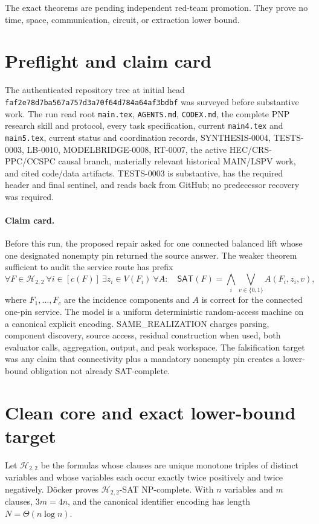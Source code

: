 \documentclass[11pt]{article}
\newcommand{\SAT}{\mathsf{SAT}}
\newcommand{\Htwo}{\mathcal H_{2,2}}
\begin{document}
The exact theorems are pending independent red-team promotion.  They prove
no time, space, communication, circuit, or extraction lower bound.

\section{Preflight and claim card}

The authenticated repository tree at initial head
\texttt{faf2e78d7ba567a757d3a70f64d784a64af3bdbf} was surveyed before
substantive work.  The run read root \texttt{main.tex}, \texttt{AGENTS.md},
\texttt{CODEX.md}, the complete PNP research skill and protocol, every task
specification, current \texttt{main4.tex} and \texttt{main5.tex}, current
status and coordination records, SYNTHESIS-0004, TESTS-0003, LB-0010,
MODELBRIDGE-0008, RT-0007, the active HEC/CRS-PPC/CCSPC causal branch,
materially relevant historical MAIN/LSPV work, and cited code/data artifacts.
TESTS-0003 is substantive, has the required header and final sentinel, and
reads back from GitHub; no predecessor recovery was required.

\paragraph{Claim card.}
Before this run, the proposed repair asked for one connected balanced lift
whose one designated nonempty pin returned the source answer.  The weaker
theorem sufficient to audit the service route has prefix
\[
 \forall F\in\Htwo\ \forall i\in[c(F)]\ \exists z_i\in V(F_i)\
 \forall A:\quad
 \SAT(F)=\bigwedge_i\bigvee_{v\in\{0,1\}}
 A(F_i,z_i,v),                                             \tag{1}
\]
where $F_1,\ldots,F_c$ are the incidence components and $A$ is correct for
the connected one-pin service.  The model is a uniform deterministic
random-access machine on a canonical explicit encoding.  SAME\_REALIZATION
charges parsing, component discovery, source access, residual construction
when used, both evaluator calls, aggregation, output, and peak workspace.
The falsification target was any claim that connectivity plus a mandatory
nonempty pin creates a lower-bound obligation not already SAT-complete.

\section{Clean core and exact lower-bound target}

Let $\Htwo$ be the formulas whose clauses are unique monotone triples of
distinct variables and whose variables each occur exactly twice positively
and twice negatively.  D\"ocker proves $\Htwo$-SAT NP-complete.  With $n$
variables and $m$ clauses, $3m=4n$, and the canonical identifier encoding has
length $N=\Theta(n\log n)$.
\end{document}
